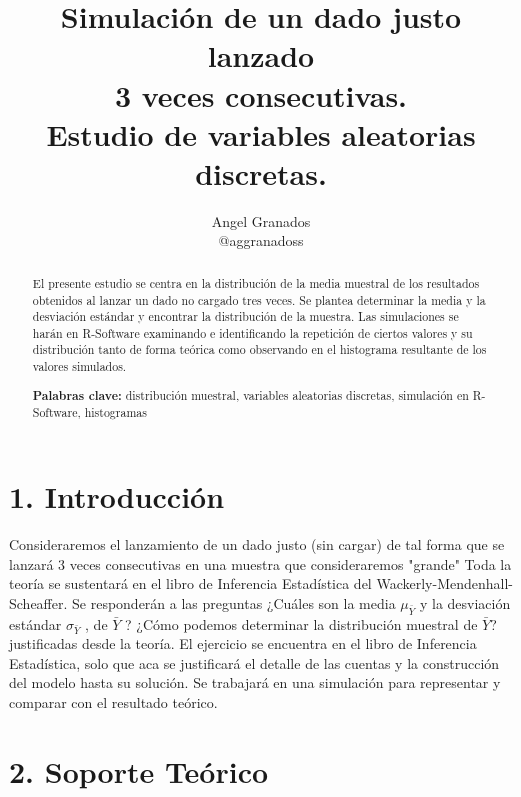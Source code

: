 \documentclass[
]{article}
\author{}
\date{\vspace{-2.5em}}
\begin{document}
\begin{titlepage}
  \title{Simulación de un dado justo lanzado \\ 3 veces consecutivas. \\ Estudio de variables aleatorias discretas.}
  \author{Angel Granados \\ {\small @aggranadoss}}
  \maketitle
  \begin{abstract}
    El presente estudio se centra en la distribución de la media muestral de los resultados obtenidos al lanzar un dado no cargado tres veces. Se plantea determinar la media y la desviación estándar y encontrar la distribución de la muestra. Las simulaciones se harán en R-Software examinando e identificando la repetición de ciertos valores y su distribución tanto de forma teórica como observando en el histograma resultante de los valores simulados.
    
    \textbf{Palabras clave:} distribución muestral, variables aleatorias discretas, simulación en R-Software, histogramas
  \end{abstract}
\end{titlepage}

\hypertarget{introducciuxf3n}{%
\section{1. Introducción}\label{introducciuxf3n}}

Consideraremos el lanzamiento de un dado justo (sin cargar) de tal forma que se lanzará 3 veces consecutivas en una muestra que consideraremos "grande" Toda la teoría se sustentará en el libro de Inferencia Estadística del Wackerly-Mendenhall-Scheaffer. Se responderán a las preguntas ¿Cuáles son la media $\mu_{\bar{Y}}$  y la desviación estándar $\sigma_{\bar{Y}}$ , de $\bar{Y}$ ? ¿Cómo podemos determinar la
distribución muestral de $\bar{Y}$? justificadas desde la teoría. El ejercicio se encuentra en el libro de Inferencia Estadística, solo que aca se justificará el detalle de las cuentas y la construcción del modelo hasta su solución. Se trabajará en una simulación para representar y comparar con el resultado teórico.     

\hypertarget{soporte-teuxf3rico}{%
\section{2. Soporte Teórico}\label{soporte-teuxf3rico}}
\end{document}
